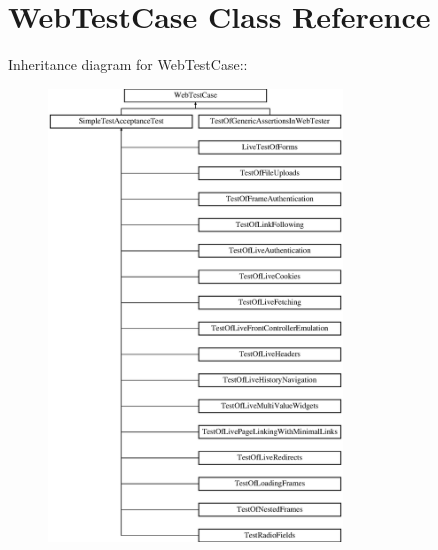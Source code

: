 \hypertarget{class_web_test_case}{
\section{WebTestCase Class Reference}
\label{class_web_test_case}
}
Inheritance diagram for WebTestCase::\begin{figure}[H]
\begin{center}
\leavevmode
\includegraphics[height=12cm]{class_web_test_case}
\end{center}
\end{figure}

